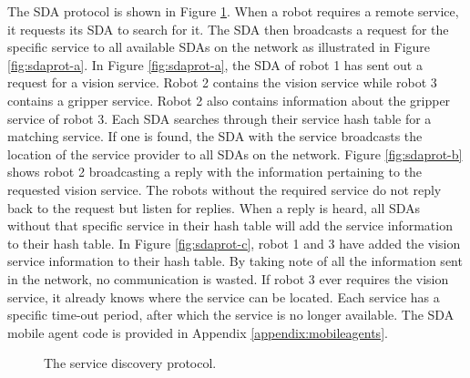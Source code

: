       The SDA protocol is shown in Figure \ref{fig:sdaprotocol}.
      When a robot requires a remote service, it requests its SDA to search for 
        it.
      The SDA then broadcasts a request for the specific service to all available
        SDAs on the network as illustrated in Figure \ref{fig:sdaprot-a}.
      In Figure \ref{fig:sdaprot-a}, the SDA of robot 1 has sent out a request
        for a vision service.
      Robot 2 contains the vision service while robot 3 contains a gripper 
        service.
      Robot 2 also contains information about the gripper service of robot 3.
      Each SDA searches through their service hash table for a matching service.
      If one is found, the SDA with the service broadcasts the location of the
        service provider to all SDAs on the network.
      Figure \ref{fig:sdaprot-b} shows robot 2 broadcasting a reply with the
        information pertaining to the requested vision service.
      The robots without the required service do not reply back to the request
        but listen for replies.
      When a reply is heard, all SDAs without that specific service in their
        hash table will add the service information to their hash table.
      In Figure \ref{fig:sdaprot-c}, robot 1 and 3 have added the vision service
        information to their hash table.
      By taking note of all the information sent in the network, no communication 
        is wasted.
      If robot 3 ever requires the vision service, it already knows where the 
        service can be located.
      Each service has a specific time-out period, after which the service is
        no longer available.
      The SDA mobile agent code is provided in Appendix 
        \ref{appendix:mobileagents}.
      \begin{figure}%
      \begin{center}
      \end{center}
      \caption{The service discovery protocol.}
      \label{fig:sdaprotocol}
      \end{figure}
   
